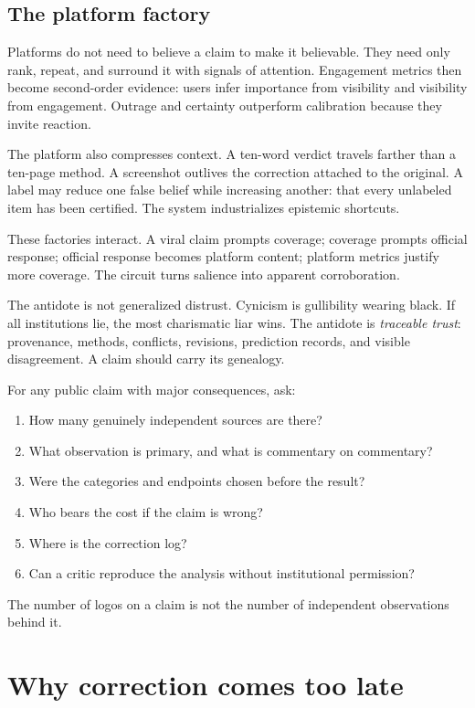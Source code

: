 ﻿\documentclass[12pt,a4paper]{book}
\begin{document}
\subsection{The platform factory}

Platforms do not need to believe a claim to make it believable. They need only rank, repeat, and surround it with signals of attention. Engagement metrics then become second-order evidence: users infer importance from visibility and visibility from engagement. Outrage and certainty outperform calibration because they invite reaction.

The platform also compresses context. A ten-word verdict travels farther than a ten-page method. A screenshot outlives the correction attached to the original. A label may reduce one false belief while increasing another: that every unlabeled item has been certified. The system industrializes epistemic shortcuts.

These factories interact. A viral claim prompts coverage; coverage prompts official response; official response becomes platform content; platform metrics justify more coverage. The circuit turns salience into apparent corroboration.

The antidote is not generalized distrust. Cynicism is gullibility wearing black. If all institutions lie, the most charismatic liar wins. The antidote is \emph{traceable trust}: provenance, methods, conflicts, revisions, prediction records, and visible disagreement. A claim should carry its genealogy.


For any public claim with major consequences, ask:
\begin{enumerate}
  \item How many genuinely independent sources are there?
  \item What observation is primary, and what is commentary on commentary?
  \item Were the categories and endpoints chosen before the result?
  \item Who bears the cost if the claim is wrong?
  \item Where is the correction log?
  \item Can a critic reproduce the analysis without institutional permission?
\end{enumerate}
The number of logos on a claim is not the number of independent observations behind it.


\section{Why correction comes too late}
\end{document}
